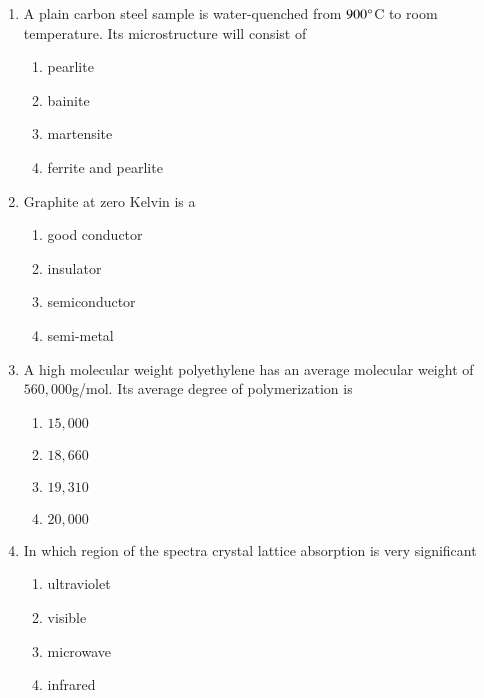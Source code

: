 \documentclass[journal,12pt,onecolumn]{IEEEtran}
\theoremstyle{remark}
\begin{document}
\begin{enumerate}
\item A plain carbon steel sample is water-quenched from $900\degree$C to room temperature. Its microstructure will consist of

\begin{enumerate}
	\item pearlite
	\item bainite
	\item martensite
	\item ferrite and pearlite
\end{enumerate}

\item Graphite at zero Kelvin is a

\begin{enumerate}
	\item good conductor
	\item insulator
	\item semiconductor
	\item semi-metal
\end{enumerate}

\item A high molecular weight polyethylene has an average molecular weight of $560,000$g/mol. Its average degree of polymerization is

\begin{enumerate}
	\item $15,000$
	\item $18,660$
	\item $19,310$
	\item $20,000$
\end{enumerate}

\item In which region of the spectra crystal lattice absorption is very significant

\begin{enumerate}
	\item ultraviolet
	\item visible
	\item microwave
	\item infrared
\end{enumerate}

\end{enumerate}
\end{document}

